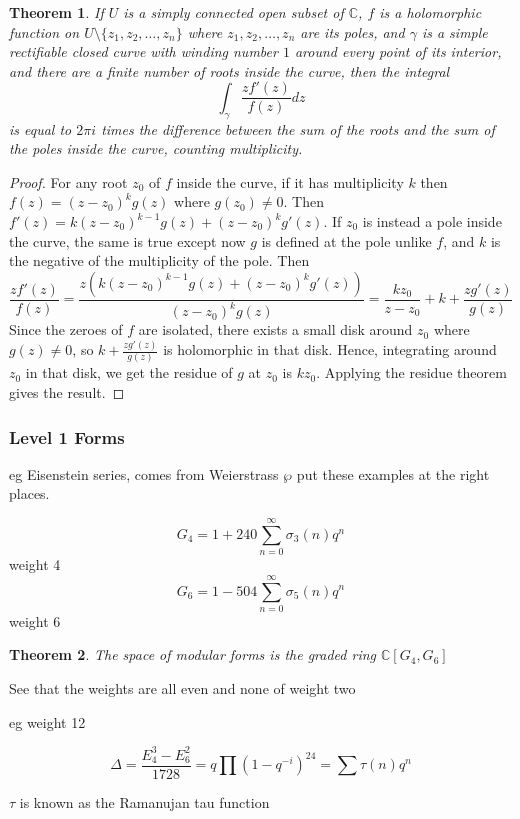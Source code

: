 \documentclass{article}
\newtheorem{theorem}{Theorem}[section]
\theoremstyle{definition}
\theoremstyle{definition}
\theoremstyle{definition}
\newcommand{\C}{\mathbb{C}}
\begin{document}
\begin{theorem} \label{extended-argument-principle}
    If $U$ is a simply connected open subset of $\mathbb C$, $f$ is a holomorphic function on $U\setminus\{z_1,z_2,\dots,z_n\}$ where $z_1,z_2,\dots,z_n$ are its poles, and $\gamma$ is a simple rectifiable closed curve with winding number $1$ around every point of its interior, and there are a finite number of roots inside the curve, then the integral
    $$\int_\gamma \frac{zf'(z)}{f(z)}dz$$
    is equal to $2\pi i$ times the difference between the sum of the roots and the sum of the poles inside the curve, counting multiplicity.
\end{theorem}
\begin{proof}
    For any root $z_0$ of $f$ inside the curve, if it has multiplicity $k$ then $f(z)=(z-z_0)^kg(z)$ where $g(z_0)\neq 0$. Then $f'(z)=k(z-z_0)^{k-1}g(z)+(z-z_0)^kg'(z)$. If $z_0$ is instead a pole inside the curve, the same is true except now $g$ is defined at the pole unlike $f$, and $k$ is the negative of the multiplicity of the pole. Then
    $$\frac{zf'(z)}{f(z)}=\frac{z(k(z-z_0)^{k-1}g(z)+(z-z_0)^kg'(z))}{(z-z_0)^kg(z)}=\frac{kz_0}{z-z_0}+k+\frac{zg'(z)}{g(z)}$$
    Since the zeroes of $f$ are isolated, there exists a small disk around $z_0$ where $g(z)\neq 0$, so $k+\frac{zg'(z)}{g(z)}$ is holomorphic in that disk. Hence, integrating around $z_0$ in that disk, we get the residue of $g$ at $z_0$ is $kz_0$. Applying the residue theorem gives the result.
\end{proof}


\subsubsection{Level 1 Forms}
eg Eisenstein series, comes from Weierstrass $\wp$
put these examples at the right places.

$$G_4=1+240\sum_{n=0}^\infty \sigma_3(n)q^n$$
weight 4
$$G_6=1-504\sum_{n=0}^\infty \sigma_5(n)q^n$$
weight 6

\begin{theorem} The space of modular forms is the graded ring
    $\C[G_4,G_6]$
\end{theorem}

See that the weights are all even and none of weight two


eg weight 12

$$\Delta=\frac{E_4^3-E_6^2}{1728}=q\prod(1-q^{-i})^{24}=\sum \tau(n)q^n$$

$\tau$ is known as the Ramanujan tau function
\end{document}
